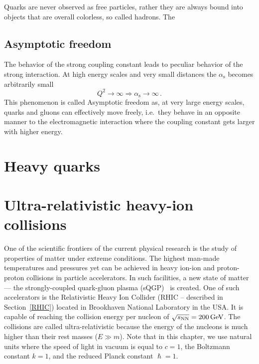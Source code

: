 Quarks are never observed as free particles, rather they are always bound into objects that are overall colorless, so called hadrons. The 

\subsection{Asymptotic freedom}

The behavior of the strong coupling constant leads to peculiar behavior of the strong interaction. At high energy scales and very small distances the $\alpha_\mathrm{s}$ becomes arbitrarily small
\begin{equation}
 Q^2 \rightarrow \infty \Rightarrow \alpha_\mathrm{s} \rightarrow \infty\,.
\end{equation}
This phenomenon is called Asymptotic freedom as, at very large energy scales, quarks and gluons can effectively move freely, i.e.\ they behave in an opposite manner to the electromagnetic interaction where the coupling constant gets larger with higher energy.

\section{Heavy quarks}

\section{Ultra-relativistic heavy-ion collisions}
One of the scientific frontiers of the current physical research is the study of properties of matter under extreme conditions. The highest man-made temperatures and pressures yet can be achieved in heavy ion-ion and proton-proton collisions in particle accelerators.
In such facilities, a new state of matter --- the strongly-coupled quark-gluon plasma (sQGP)~\cite{QGPdiscovered} is created\@. One of such accelerators is the Relativistic Heavy Ion Collider (RHIC -- described in Section~\ref{RHIC}) located in Brookhaven National Laboratory in the USA\@. It is capable of reaching the collision energy per nucleon of $\sqrt{s_\text{NN}}= \SI{200}{\giga\electronvolt}$\@. The collisions are called ultra-relativistic because the energy of the nucleons is much higher than their rest masses ($E \gg m$). Note that in this chapter, we use natural units where the speed of light in vacuum is equal to $c = 1$, the Boltzmann constant $k = 1$, and the reduced Planck constant $\hslash = 1$\@. 

